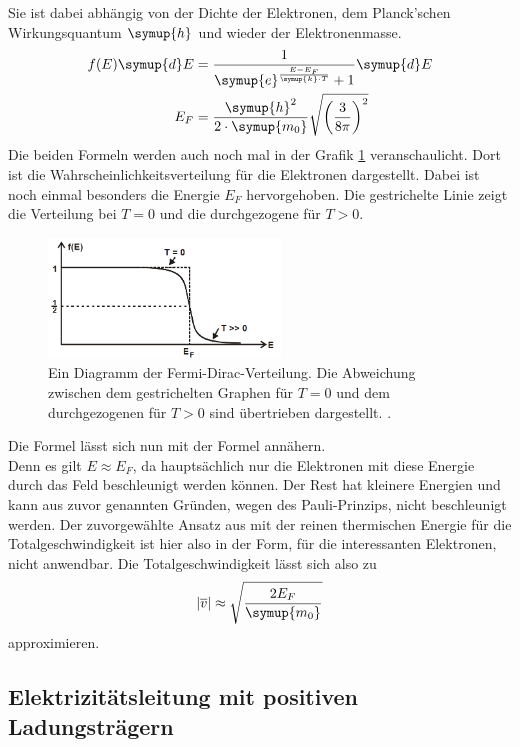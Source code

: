 Sie ist dabei abhängig von der Dichte der Elektronen, dem Planck'schen Wirkungsquantum \cite{Planck} $\symup{h}$ und wieder der Elektronenmasse.\\
\begin{align}
  f(E)\symup{d}E &= \frac{1}{\symup{e}^{\frac{E-E_F}{\symup{k} \cdot T}}+1} \symup{d}E \label{eqn:fermidirac}\\
  E_F &= \frac{\symup{h}^2}{2 \cdot \symup{m_0}}\sqrt{\left(\frac{3}{8\pi}\right)^2} \label{eqn:E_F}
\end{align} 
Die beiden Formeln werden auch noch mal in der Grafik \ref{img:fermi} veranschaulicht.
Dort ist die Wahrscheinlichkeitsverteilung für die Elektronen dargestellt. Dabei ist noch einmal besonders die Energie $E_F$ hervorgehoben.
Die gestrichelte Linie zeigt die Verteilung bei $T=0$ und die durchgezogene für $T>0$.

\begin{figure}[H]
  \centering
  \includegraphics[width=0.55\textwidth]{images/dirac.PNG}
  \caption{Ein Diagramm der Fermi-Dirac-Verteilung. Die Abweichung zwischen dem gestrichelten Graphen für $T=0$ 
  und dem durchgezogenen für $T>0$ sind übertrieben dargestellt.  \protect \cite{V311}.}
  \label{img:fermi}
\end{figure}

\noindent
Die Formel  lässt sich nun mit der Formel  annähern.\\
Denn es gilt  $ E\approx E_F$, da hauptsächlich nur die Elektronen mit diese Energie durch das Feld beschleunigt werden können.
Der Rest hat kleinere Energien und kann aus zuvor genannten Gründen, wegen des Pauli-Prinzips, nicht beschleunigt werden.
Der zuvorgewählte Ansatz aus  mit der reinen thermischen Energie für die Totalgeschwindigkeit ist hier also in der Form, für die interessanten Elektronen, nicht anwendbar.
Die Totalgeschwindigkeit lässt sich also zu 
\begin{equation}
  |\overline{v}| \approx \sqrt{\frac{2E_F}{\symup{m_0}}}
\end{equation}
approximieren.\\







\subsection{Elektrizitätsleitung mit positiven Ladungsträgern}





